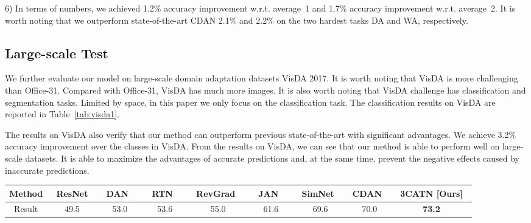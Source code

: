 \documentclass[sigconf]{acmart}
\begin{document}
6) In terms of numbers, we achieved 1.2\% accuracy improvement w.r.t. average~1 and 1.7\% accuracy improvement w.r.t. average~2. It is worth noting that we outperform state-of-the-art CDAN 2.1\% and 2.2\% on the two hardest tasks DA and WA, respectively. 


\subsection{Large-scale Test}
We further evaluate our model on large-scale domain adaptation datasets VisDA 2017. It is worth noting that VisDA is more challenging than Office-31. Compared with Office-31, VisDA has much more images. It is also worth noting that VisDA challenge has classification and segmentation tasks. Limited by space, in this paper we only focus on the classification task. The classification results on VisDA are reported in Table~\ref{tab:visda1}.




The results on VisDA also verify that our method can outperform previous state-of-the-art with significant advantages. We achieve 3.2\% accuracy improvement over the  classes in VisDA. From the results on VisDA, we can see that our method is able to perform well on large-scale datasets. It is able to maximize the advantages of accurate predictions and, at the same time, prevent the negative effects caused by inaccurate predictions. 



\begin{table*}[ht!p]
\centering
\caption{Domain adaptation results (accuracy~\%) on VisDA-2017 dataset. All of the base networks are ResNet-50. }
\vspace{-8pt}
\label{tab:visda1}
\begin{tabular}{ccccccccc}
\toprule
Method & ~ResNet\cite{he2016deep}~ & ~DAN~\cite{long2015learning}~ & ~RTN~\cite{long2016unsupervised}~ & ~RevGrad~\cite{ganin2016domain}~  & ~JAN~\cite{long2017deep}~ & ~SimNet~\cite{pinheiro2018unsupervised}~ & CDAN~\cite{long2018conditional} & ~3CATN [Ours]~\\
\midrule
Result & 49.5 & 53.0 & 53.6 & 55.0  & 61.6 & 69.6 & 70.0 & {\bf 73.2} \\ 
\bottomrule
\end{tabular}
\end{table*}
\end{document}

